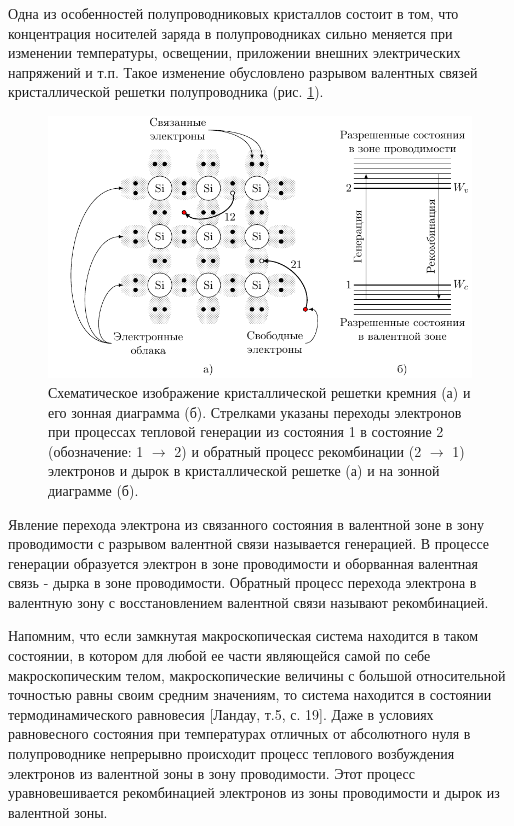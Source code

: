 \documentclass[a4paper,14pt]{extarticle}
\begin{document}
Одна из особенностей полупроводниковых кристаллов состоит в том, что концентрация носителей заряда в полупроводниках сильно меняется при изменении температуры, освещении, приложении внешних электрических напряжений и т.п. Такое изменение обусловлено разрывом валентных связей кристаллической решетки полупроводника (рис. \ref{fig:figure1}).
\begin{figure}[H]
	\centering
	\includegraphics[scale=1.2]{fig/cryst}
	\caption{Схематическое изображение кристаллической решетки кремния (а) и его зонная диаграмма (б). Стрелками указаны переходы электронов при процессах тепловой генерации из состояния 1 в состояние 2 (обозначение: 1 $\to$ 2) и обратный процесс рекомбинации (2 $\to$ 1) электронов и дырок в кристаллической решетке (а) и на зонной диаграмме (б).}
	\label{fig:figure1}
\end{figure}

Явление перехода электрона из связанного состояния в валентной зоне в зону проводимости с разрывом валентной связи называется генерацией. В процессе генерации образуется электрон в зоне проводимости и оборванная валентная связь - дырка в зоне проводимости. Обратный процесс перехода электрона в валентную зону с восстановлением валентной связи называют рекомбинацией.

Напомним, что если замкнутая макроскопическая система находится в таком состоянии, в котором для любой ее части являющейся самой по себе макроскопическим телом, макроскопические величины с большой относительной точностью равны своим средним значениям, то система находится в состоянии термодинамического равновесия [Ландау, т.5, с. 19]. Даже в условиях равновесного состояния при температурах отличных от абсолютного нуля в полупроводнике непрерывно происходит процесс теплового возбуждения электронов из валентной зоны в зону проводимости. Этот процесс уравновешивается рекомбинацией электронов из зоны проводимости и дырок из валентной зоны.
\end{document}
